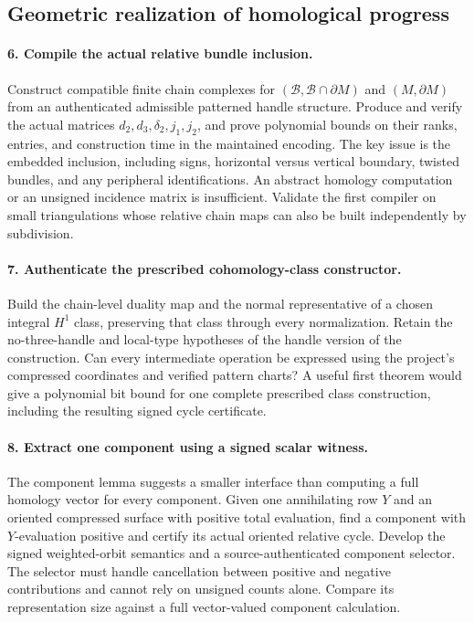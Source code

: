 \subsection{Geometric realization of homological progress}

\paragraph{6. Compile the actual relative bundle inclusion.}
Construct compatible finite chain complexes for
$(\mathcal B,\mathcal B\cap\partial M)$ and $(M,\partial M)$ from an
authenticated admissible patterned handle structure. Produce and verify
the actual matrices $d_2,d_3,\delta_2,j_1,j_2$, and prove polynomial bounds
on their ranks, entries, and construction time in the maintained encoding.
The key issue is the embedded inclusion, including signs, horizontal versus
vertical boundary, twisted bundles, and any peripheral identifications.
An abstract homology computation or an unsigned incidence matrix is
insufficient. Validate the first compiler on small triangulations whose
relative chain maps can also be built independently by subdivision.

\paragraph{7. Authenticate the prescribed cohomology-class constructor.}
Build the chain-level duality map and the normal representative of a chosen
integral $H^1$ class, preserving that class through every normalization.
Retain the no-three-handle and local-type hypotheses of the handle version
of the construction. Can every intermediate operation be expressed using
the project's compressed coordinates and verified pattern charts? A useful
first theorem would give a polynomial bit bound for one complete prescribed
class construction, including the resulting signed cycle certificate.

\paragraph{8. Extract one component using a signed scalar witness.}
The component lemma suggests a smaller interface than computing a full
homology vector for every component. Given one annihilating row $Y$ and an
oriented compressed surface with positive total evaluation, find a component
with $Y$-evaluation positive and certify its actual oriented relative cycle.
Develop the signed weighted-orbit semantics and a source-authenticated
component selector. The selector must handle cancellation between positive
and negative contributions and cannot rely on unsigned counts alone.
Compare its representation size against a full vector-valued component
calculation.

